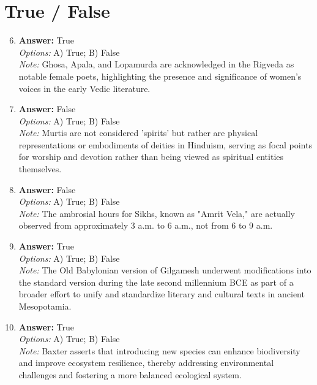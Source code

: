 \documentclass[12pt]{article}
\begin{document}
\section*{True / False}
\begin{enumerate}[label=\arabic*.]
\setcounter{enumi}{5}
\item \textbf{Answer:} True
\\ \textit{Options:} A) True; B) False
\\ \textit{Note:} Ghosa, Apala, and Lopamurda are acknowledged in the Rigveda as notable female poets, highlighting the presence and significance of women's voices in the early Vedic literature.
\item \textbf{Answer:} False
\\ \textit{Options:} A) True; B) False
\\ \textit{Note:} Murtis are not considered 'spirits' but rather are physical representations or embodiments of deities in Hinduism, serving as focal points for worship and devotion rather than being viewed as spiritual entities themselves.
\item \textbf{Answer:} False
\\ \textit{Options:} A) True; B) False
\\ \textit{Note:} The ambrosial hours for Sikhs, known as "Amrit Vela," are actually observed from approximately 3 a.m. to 6 a.m., not from 6 to 9 a.m.
\item \textbf{Answer:} True
\\ \textit{Options:} A) True; B) False
\\ \textit{Note:} The Old Babylonian version of Gilgamesh underwent modifications into the standard version during the late second millennium BCE as part of a broader effort to unify and standardize literary and cultural texts in ancient Mesopotamia.
\item \textbf{Answer:} True
\\ \textit{Options:} A) True; B) False
\\ \textit{Note:} Baxter asserts that introducing new species can enhance biodiversity and improve ecosystem resilience, thereby addressing environmental challenges and fostering a more balanced ecological system.
\end{enumerate}
\end{document}
